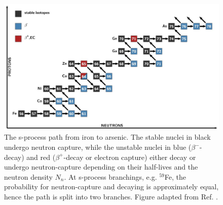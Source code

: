 \begin{figure}[t]
\centering
\includegraphics[width=6.5in]{Chapter-1/figs/sProcess_path.jpg}
\caption{\label{fig:sProcess_path}The s-process path from iron to arsenic. The stable nuclei in black undergo neutron capture, while the unstable nuclei in blue ($\beta^{-}$-decay) and red ($\beta^{+}$-decay or electron capture) either decay or undergo neutron-capture depending on their half-lives and the neutron density $N_{n}$. At s-process branchings, e.g. $^{59}$Fe, the probability for neutron-capture and decaying is approximately equal, hence the path is split into two branches. Figure adapted from Ref. \cite{Reifarth2014}.}
\end{figure}






